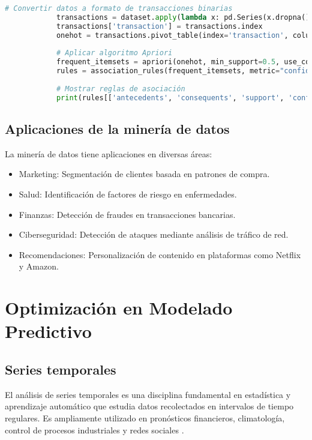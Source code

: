 \begin{itemize}
\begin{lstlisting}[language=Python, caption={Reglas de asociación con Apriori en Python}]
			# Convertir datos a formato de transacciones binarias
			transactions = dataset.apply(lambda x: pd.Series(x.dropna().values), axis=1).stack().reset_index(level=1, drop=True).to_frame('item')
			transactions['transaction'] = transactions.index
			onehot = transactions.pivot_table(index='transaction', columns='item', aggfunc=lambda x: 1, fill_value=0)
			
			# Aplicar algoritmo Apriori
			frequent_itemsets = apriori(onehot, min_support=0.5, use_colnames=True)
			rules = association_rules(frequent_itemsets, metric="confidence", min_threshold=0.7)
			
			# Mostrar reglas de asociación
			print(rules[['antecedents', 'consequents', 'support', 'confidence', 'lift']])
		\end{lstlisting}
		
		\subsection{Aplicaciones de la minería de datos}
		
		La minería de datos tiene aplicaciones en diversas áreas:
		
		\begin{itemize}
			\item Marketing: Segmentación de clientes basada en patrones de compra.
			\item Salud: Identificación de factores de riesgo en enfermedades.
			\item Finanzas: Detección de fraudes en transacciones bancarias.
			\item Ciberseguridad: Detección de ataques mediante análisis de tráfico de red.
			\item Recomendaciones: Personalización de contenido en plataformas como Netflix y Amazon.
		\end{itemize}
		\section{Optimización en Modelado Predictivo}
		\subsection{Series temporales}
		
		El análisis de series temporales es una disciplina fundamental en estadística y aprendizaje automático que estudia datos recolectados en intervalos de tiempo regulares. Es ampliamente utilizado en pronósticos financieros, climatología, control de procesos industriales y redes sociales \cite{box2015time}.
		

\end{itemize}
